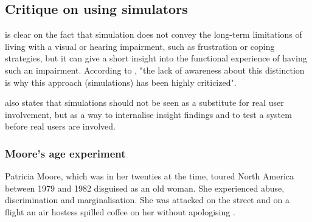 \subsection{Critique on using simulators}
\textcite{GoodmanDeane:2007it} is clear on the fact that simulation does not convey the long-term limitations of living with a visual or hearing impairment, such as frustration or coping strategies, but it can give a short insight into the functional experience of having such an impairment. According to \textcite[3]{bai_evaluation_2016}, "the lack of awareness about this distinction is why this approach (simulations) has been highly criticized". 

\textcite{GoodmanDeane:2007it} also states that simulations should not be seen as a substitute for real user involvement, but as a way to internalise insight findings and to test a system before real users are involved. 

\subsubsection{Moore's age experiment}
Patricia Moore, which was in her twenties at the time, toured North America between 1979 and 1982 disguised as an old woman. She experienced abuse, discrimination and marginalisation. She was attacked on the street and on a flight an air hostess spilled coffee on her without apologising \parencite{coleman_design_2007}. 











